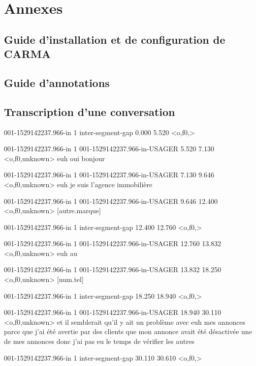 \chapter{Annexes}
\section{Guide d'installation et de configuration de CARMA}
\label{ap:guideInstall}

%

\section{Guide d'annotations}
\label{ap:guidelines}
%


\section{Transcription d'une conversation}
\label{ap:transcription}
001-1529142237.966-in 1 inter-segment-gap 0.000 5.520 <o,f0,>

001-1529142237.966-in 1 001-1529142237.966-in-USAGER 5.520 7.130 <o,f0,unknown> euh oui bonjour

001-1529142237.966-in 1 001-1529142237.966-in-USAGER 7.130 9.646 <o,f0,unknown> euh je suis l'agence immobilière

001-1529142237.966-in 1 001-1529142237.966-in-USAGER 9.646 12.400 <o,f0,unknown> [autre.marque]

001-1529142237.966-in 1 inter-segment-gap 12.400 12.760 <o,f0,>

001-1529142237.966-in 1 001-1529142237.966-in-USAGER 12.760 13.832 <o,f0,unknown> euh au

001-1529142237.966-in 1 001-1529142237.966-in-USAGER 13.832 18.250 <o,f0,unknown> [num.tel]

001-1529142237.966-in 1 inter-segment-gap 18.250 18.940 <o,f0,>

001-1529142237.966-in 1 001-1529142237.966-in-USAGER 18.940 30.110 <o,f0,unknown> et il semblerait qu'il y ait un problème avec euh mes annonces parce que j'ai été avertie par des clients que mon annonce avait été désactivée une de mes annonces donc j'ai pas eu le temps de vérifier les autres

001-1529142237.966-in 1 inter-segment-gap 30.110 30.610 <o,f0,>

